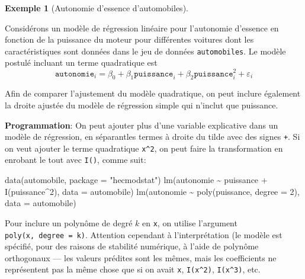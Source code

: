 \documentclass[
  11pt,
  letterpaper,
]{scrbook}
\newenvironment{Shaded}{\begin{snugshade}}{\end{snugshade}}
\newcommand{\AttributeTok}[1]{\textcolor[rgb]{0.40,0.45,0.13}{#1}}
\newcommand{\DecValTok}[1]{\textcolor[rgb]{0.68,0.00,0.00}{#1}}
\newcommand{\FunctionTok}[1]{\textcolor[rgb]{0.28,0.35,0.67}{#1}}
\newcommand{\NormalTok}[1]{\textcolor[rgb]{0.00,0.23,0.31}{#1}}
\newcommand{\SpecialCharTok}[1]{\textcolor[rgb]{0.37,0.37,0.37}{#1}}
\newcommand{\StringTok}[1]{\textcolor[rgb]{0.13,0.47,0.30}{#1}}
\theoremstyle{definition}
\newtheorem{example}{Exemple}[chapter]
\theoremstyle{remark}
\begin{document}
\begin{example}[Autonomie d'essence
d'automobiles]\protect\hypertarget{exm-automobile}{}\label{exm-automobile}

Considérons un modèle de régression linéaire pour l'autonomie d'essence
en fonction de la puissance du moteur pour différentes voitures dont les
caractéristiques sont données dans le jeu de données
\texttt{automobiles}. Le modèle postulé incluant un terme quadratique
est \[
\texttt{autonomie}_i = \beta_0 + \beta_1 \texttt{puissance}_i + \beta_2 \texttt{puissance}_i^2 + \varepsilon_i
\]

Afin de comparer l'ajustement du modèle quadratique, on peut inclure
également la droite ajustée du modèle de régression simple qui n'inclut
que puissance.

\textbf{Programmation}: On peut ajouter plus d'une variable explicative
dans un modèle de régression, en séparantles termes à droite du tilde
avec des signes \texttt{+}. Si on veut ajouter le terme quadratique
\texttt{x\^{}2}, on peut faire la transformation en enrobant le tout
avec \texttt{I()}, comme suit:

\begin{Shaded}
\begin{Highlighting}[]
\FunctionTok{data}\NormalTok{(automobile, }\AttributeTok{package =} \StringTok{"hecmodstat"}\NormalTok{)}
\FunctionTok{lm}\NormalTok{(autonomie }\SpecialCharTok{\textasciitilde{}}\NormalTok{ puissance }\SpecialCharTok{+} \FunctionTok{I}\NormalTok{(puissance}\SpecialCharTok{\^{}}\DecValTok{2}\NormalTok{),  }\AttributeTok{data =}\NormalTok{ automobile)}
\FunctionTok{lm}\NormalTok{(autonomie }\SpecialCharTok{\textasciitilde{}} \FunctionTok{poly}\NormalTok{(puissance, }\AttributeTok{degree =} \DecValTok{2}\NormalTok{),  }\AttributeTok{data =}\NormalTok{ automobile)}
\end{Highlighting}
\end{Shaded}

Pour inclure un polynôme de degré \(k\) en \texttt{x}, on utilise
l'argument \texttt{poly(x,\ degree\ =\ k)}. Attention cependant à
l'interprétation (le modèle est spécifié, pour des raisons de stabilité
numérique, à l'aide de polynôme orthogonaux --- les valeurs prédites
sont les mêmes, mais les coefficients ne représentent pas la même chose
que si on avait \texttt{x}, \texttt{I(x\^{}2)}, \texttt{I(x\^{}3)}, etc.

\begin{figure}[ht!]

\centering{

}
\end{figure}
\end{example}
\end{document}
